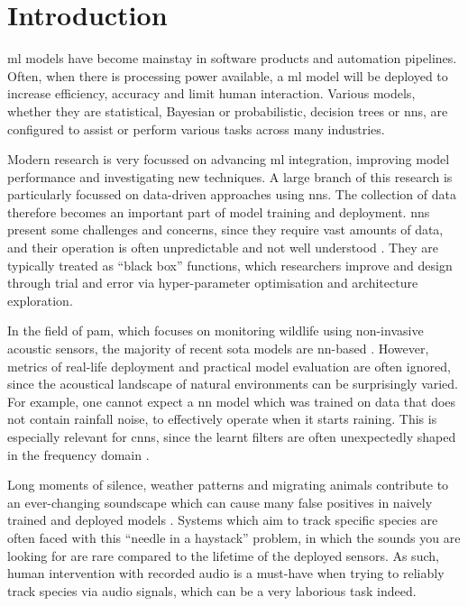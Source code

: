\chapter{Introduction}

\Ac{ml} models have become mainstay in software products and auto\-mation pipelines. Often, when there is processing power available, a \ac{ml} model will be deployed to increase efficiency, accuracy and limit human interaction. Various models, whether they are statistical, Bayesian or probabilistic, decision trees or \acfp{nn}, are configured to assist or perform various tasks across many industries.

Modern research is very focussed on advancing \ac{ml} integration, improving model per\-formance and investigating new techniques. A large branch of this research is particularly focussed on data-driven approaches using \acp{nn}. The collection of data therefore becomes an important part of model training and deployment. \Acp{nn} present some challenges and concerns, since they require vast amounts of data, and their operation is often unpredictable and not well understood \citep{nnsurvey}. They are typically treated as ``black box'' functions, which researchers improve and design through trial and error via hyper-para\-meter optimisation and architecture exploration.

In the field of \ac{pam}, which focuses on monitoring wildlife using non-invasive acoustic sensors, the majority of recent \ac{sota} models are \ac{nn}-based \citep{pamsurvey}. However, metrics of real-life deployment and practical model evaluation are often ignored, since the acoustical landscape of natural environments can be surpri\-singly varied. For example, one cannot expect a \ac{nn} model which was trained on data that does not contain rainfall noise, to effectively operate when it starts raining. This is especially relevant for \acp{cnn}, since the learnt filters are often unexpectedly shaped in the frequency domain \cite{sincnet}.

Long moments of silence, weather patterns and migrating animals contribute to an ever-changing soundscape which can cause many false positives in naively trained and deployed models \citep{pamguide}. Systems which aim to track specific species are often faced with this ``needle in a haystack'' problem, in which the sounds you are looking for are rare compared to the lifetime of the deployed sensors. As such, human intervention with recorded audio is a must-have when trying to reliably track species via audio signals, which can be a very laborious task indeed.

